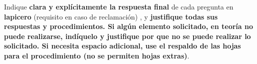 \documentclass[12pt]{article}
\begin{document}
Indique \textbf{clara y explícitamente la respuesta final} de cada pregunta %
en \textbf{lapicero} (requisito en caso de reclamación) %
, y \textbf{justifique todas sus respuestas y procedimientos. Si algún elemento solicitado, en teoría no puede realizarse, indíquelo y justifique por que no se puede realizar lo solicitado. %
Si necesita espacio adicional, use el respaldo de las hojas para el procedimiento (no se permiten hojas extras)}. %




\end{document}
